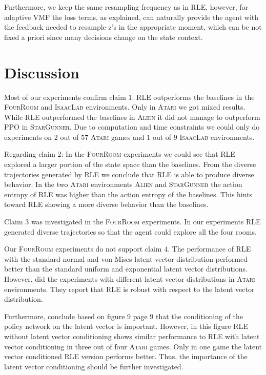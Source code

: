 \documentclass[10pt]{article} %
\begin{document}
Furthermore, we keep the same resampling frequency as in \textsc{RLE}, however, for adaptive VMF the loss terms, as explained, can naturally provide the agent with the feedback needed to resample z's in the appropriate moment, 
which can be not fixed a priori since many decisions change on the state context. 

\vspace{-6pt}
\section{Discussion}
\vspace{-6pt}
Most of our experiments confirm claim $1$. \textsc{RLE} outperforms the baselines in the \textsc{FourRoom} and \textsc{IsaacLab} environments. Only in \textsc{Atari} we got mixed results. While \textsc{RLE} outperformed the baselines in \textsc{Alien} it did not manage to outperform \textsc{PPO} in \textsc{StarGunner}. Due to computation and time constraints we could only do experiments on $2$ out of $57$ \textsc{Atari} games and $1$ out of $9$ \textsc{IsaacLab} environments. 

Regarding claim $2$: In the \textsc{FourRoom} experiments we could see that \textsc{RLE} explored a larger portion of the state space than the baselines. From the diverse trajectories generated by \textsc{RLE} we conclude that \textsc{RLE} is able to produce diverse behavior. In the two \textsc{Atari} environments \textsc{Alien} and \textsc{StarGunner} the action entropy of \textsc{RLE} was higher than the action entropy of the baselines. This hints toward \textsc{RLE} showing a more diverse behavior than the baselines. 

Claim $3$ was investigated in the \textsc{FourRoom} experiments. In our experiments \textsc{RLE} generated diverse trajectories so that the agent could explore all the four rooms.

Our \textsc{FourRoom} experiments do not support claim $4$. The performance of \textsc{RLE} with the standard normal and von Mises latent vector distribution performed better than the standard uniform and exponential latent vector distributions. However, \cite{rle-paper} did the experiments with different latent vector distributions in \textsc{Atari} environments. They report that \textsc{RLE} is robust with respect to the latent vector distribution.

Furthermore, \cite{rle-paper} conclude based on figure $9$ page $9$ that the conditioning of the policy network on the latent vector is important. However, in this figure \textsc{RLE} without latent vector conditioning shows similar performance to \textsc{RLE} with latent vector conditioning in three out of four \textsc{Atari} games. Only in one game the latent vector conditioned \textsc{RLE} version performs better. Thus, the importance of the latent vector conditioning should be further investigated.
\end{document}
